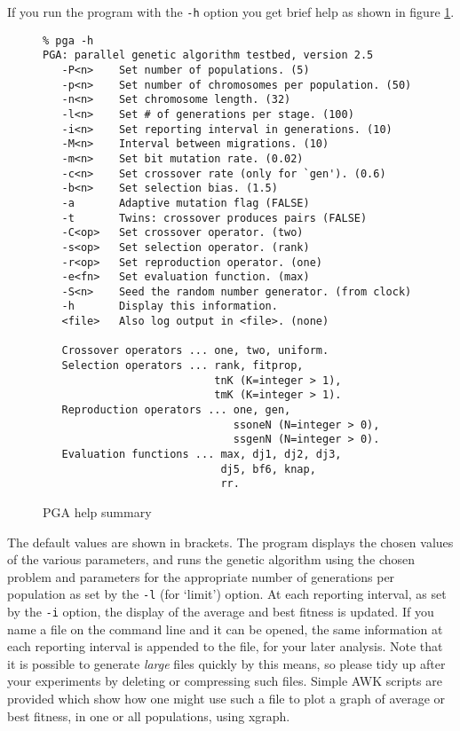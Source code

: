 If you run the program with the \verb|-h| option you get brief help
as shown in figure \ref{fig:help}.
\begin{figure}[p]
\begin{center}
\begin{verbatim}
% pga -h
PGA: parallel genetic algorithm testbed, version 2.5
   -P<n>    Set number of populations. (5)
   -p<n>    Set number of chromosomes per population. (50)
   -n<n>    Set chromosome length. (32)
   -l<n>    Set # of generations per stage. (100)
   -i<n>    Set reporting interval in generations. (10)
   -M<n>    Interval between migrations. (10)
   -m<n>    Set bit mutation rate. (0.02)
   -c<n>    Set crossover rate (only for `gen'). (0.6)
   -b<n>    Set selection bias. (1.5)
   -a       Adaptive mutation flag (FALSE)
   -t       Twins: crossover produces pairs (FALSE)
   -C<op>   Set crossover operator. (two)
   -s<op>   Set selection operator. (rank)
   -r<op>   Set reproduction operator. (one)
   -e<fn>   Set evaluation function. (max)
   -S<n>    Seed the random number generator. (from clock)
   -h       Display this information.
   <file>   Also log output in <file>. (none)

   Crossover operators ... one, two, uniform.
   Selection operators ... rank, fitprop,
                           tnK (K=integer > 1),
                           tmK (K=integer > 1).
   Reproduction operators ... one, gen,
                              ssoneN (N=integer > 0),
                              ssgenN (N=integer > 0).
   Evaluation functions ... max, dj1, dj2, dj3,
                            dj5, bf6, knap,
                            rr.
\end{verbatim}
\caption{PGA help summary}
\label{fig:help}
\end{center}
\end{figure}
The default values are shown in brackets. The program displays the
chosen values of the various parameters, and runs the genetic algorithm
using the chosen problem and parameters for the appropriate number of
generations per population as set by the \verb|-l| (for `limit') option.
At each reporting interval, as set by the \verb|-i| option, the display
of the average and best fitness is updated. If you name a file on the
command line and it can be opened, the same information at each
reporting interval is appended to the file, for your later analysis.
Note that it is possible to generate {\em large} files quickly by this
means, so please tidy up after your experiments by deleting or
compressing such files. Simple AWK scripts are provided which
show how one might use such a file to plot a graph of average or
best fitness, in one or all populations, using xgraph.

